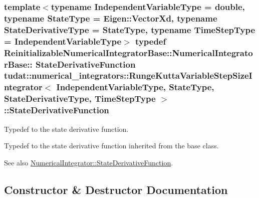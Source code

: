 \subsubsection[{\texorpdfstring{State\+Derivative\+Function}{StateDerivativeFunction}}]{\setlength{\rightskip}{0pt plus 5cm}template$<$typename Independent\+Variable\+Type  = double, typename State\+Type  = Eigen\+::\+Vector\+Xd, typename State\+Derivative\+Type  = State\+Type, typename Time\+Step\+Type  = Independent\+Variable\+Type$>$ typedef Reinitializable\+Numerical\+Integrator\+Base\+::\+Numerical\+Integrator\+Base\+:: {\bf State\+Derivative\+Function} {\bf tudat\+::numerical\+\_\+integrators\+::\+Runge\+Kutta\+Variable\+Step\+Size\+Integrator}$<$ Independent\+Variable\+Type, State\+Type, State\+Derivative\+Type, Time\+Step\+Type $>$\+::{\bf State\+Derivative\+Function}}\hypertarget{classtudat_1_1numerical__integrators_1_1RungeKuttaVariableStepSizeIntegrator_af14688890a16e581771f63f0e2909b46}{}\label{classtudat_1_1numerical__integrators_1_1RungeKuttaVariableStepSizeIntegrator_af14688890a16e581771f63f0e2909b46}


Typedef to the state derivative function. 

Typedef to the state derivative function inherited from the base class. \begin{DoxySeeAlso}{See also}
\hyperlink{classtudat_1_1numerical__integrators_1_1NumericalIntegrator_a0d0a5d48ebaf1f5ad9cd7a73b44be0fc}{Numerical\+Integrator\+::\+State\+Derivative\+Function}. 
\end{DoxySeeAlso}


\subsection{Constructor \& Destructor Documentation}
